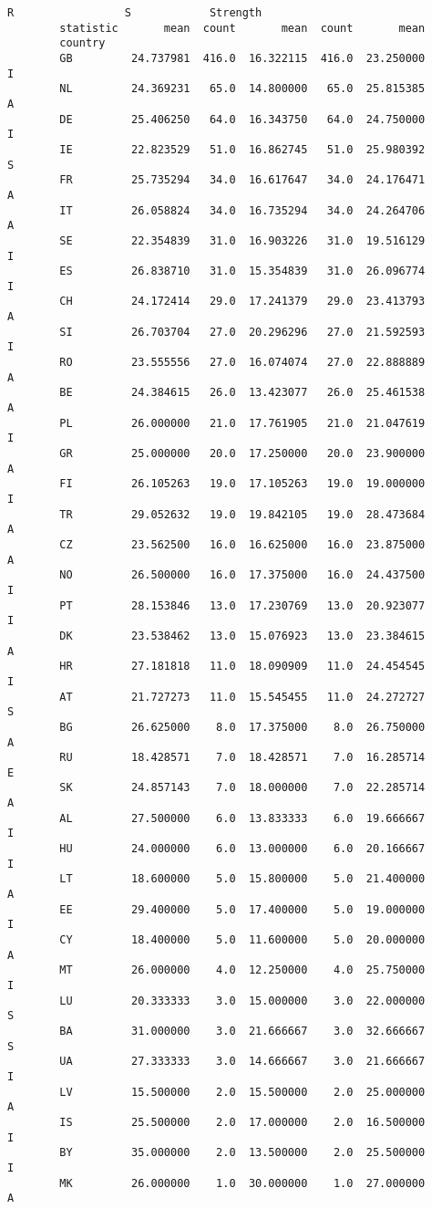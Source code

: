 \documentclass[11pt]{article}
\begin{document}
\begin{Verbatim}[commandchars=\\\{\}]
                                  R                 S            Strength  
        statistic       mean  count       mean  count       mean           
        country                                                            
        GB         24.737981  416.0  16.322115  416.0  23.250000        I  
        NL         24.369231   65.0  14.800000   65.0  25.815385        A  
        DE         25.406250   64.0  16.343750   64.0  24.750000        I  
        IE         22.823529   51.0  16.862745   51.0  25.980392        S  
        FR         25.735294   34.0  16.617647   34.0  24.176471        A  
        IT         26.058824   34.0  16.735294   34.0  24.264706        A  
        SE         22.354839   31.0  16.903226   31.0  19.516129        I  
        ES         26.838710   31.0  15.354839   31.0  26.096774        I  
        CH         24.172414   29.0  17.241379   29.0  23.413793        A  
        SI         26.703704   27.0  20.296296   27.0  21.592593        I  
        RO         23.555556   27.0  16.074074   27.0  22.888889        A  
        BE         24.384615   26.0  13.423077   26.0  25.461538        A  
        PL         26.000000   21.0  17.761905   21.0  21.047619        I  
        GR         25.000000   20.0  17.250000   20.0  23.900000        A  
        FI         26.105263   19.0  17.105263   19.0  19.000000        I  
        TR         29.052632   19.0  19.842105   19.0  28.473684        A  
        CZ         23.562500   16.0  16.625000   16.0  23.875000        A  
        NO         26.500000   16.0  17.375000   16.0  24.437500        I  
        PT         28.153846   13.0  17.230769   13.0  20.923077        I  
        DK         23.538462   13.0  15.076923   13.0  23.384615        A  
        HR         27.181818   11.0  18.090909   11.0  24.454545        I  
        AT         21.727273   11.0  15.545455   11.0  24.272727        S  
        BG         26.625000    8.0  17.375000    8.0  26.750000        A  
        RU         18.428571    7.0  18.428571    7.0  16.285714        E  
        SK         24.857143    7.0  18.000000    7.0  22.285714        A  
        AL         27.500000    6.0  13.833333    6.0  19.666667        I  
        HU         24.000000    6.0  13.000000    6.0  20.166667        I  
        LT         18.600000    5.0  15.800000    5.0  21.400000        A  
        EE         29.400000    5.0  17.400000    5.0  19.000000        I  
        CY         18.400000    5.0  11.600000    5.0  20.000000        A  
        MT         26.000000    4.0  12.250000    4.0  25.750000        I  
        LU         20.333333    3.0  15.000000    3.0  22.000000        S  
        BA         31.000000    3.0  21.666667    3.0  32.666667        S  
        UA         27.333333    3.0  14.666667    3.0  21.666667        I  
        LV         15.500000    2.0  15.500000    2.0  25.000000        A  
        IS         25.500000    2.0  17.000000    2.0  16.500000        I  
        BY         35.000000    2.0  13.500000    2.0  25.500000        I  
        MK         26.000000    1.0  30.000000    1.0  27.000000        A  
\end{Verbatim}
        
\end{document}
